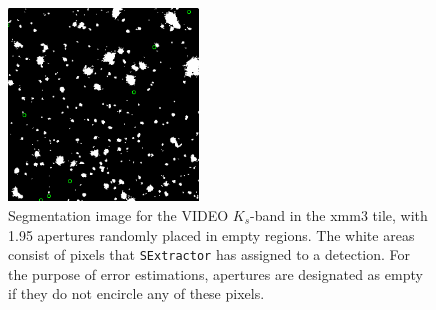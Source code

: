 \begin{figure}[!tpb] 
\centering    
\includegraphics[width=0.45\textwidth]{aperture_errors.png}
\caption[Segmentation image]{Segmentation image for the VIDEO $K_{s}$-band in the xmm3 tile, with \SI{1.95}{\arcsec} apertures randomly placed in empty regions. The white areas consist of pixels that \texttt{SExtractor} has assigned to a detection. For the purpose of error estimations, apertures are designated as empty if they do not encircle any of these pixels.}
\label{fig:segmentation}
\end{figure}


